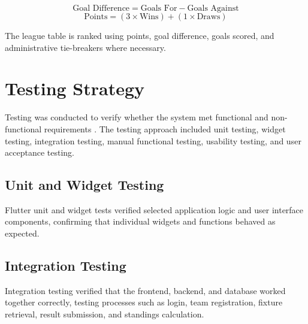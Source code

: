 \documentclass[12pt,a4paper]{report}
\begin{document}
$$\text{Goal Difference} = \text{Goals For} - \text{Goals Against}$$
$$\text{Points} = (3 \times \text{Wins}) + (1 \times \text{Draws})$$

The league table is ranked using points, goal difference, goals scored, and administrative
tie-breakers where necessary.

\section{Testing Strategy}
Testing was conducted to verify whether the system met functional and non-functional
requirements \cite{pressman2019}. The testing approach included unit testing, widget testing,
integration testing, manual functional testing, usability testing, and user acceptance testing.

\subsection{Unit and Widget Testing}
Flutter unit and widget tests verified selected application logic and user interface components,
confirming that individual widgets and functions behaved as expected.

\subsection{Integration Testing}
Integration testing verified that the frontend, backend, and database worked together correctly,
testing processes such as login, team registration, fixture retrieval, result submission, and
standings calculation.
\end{document}
